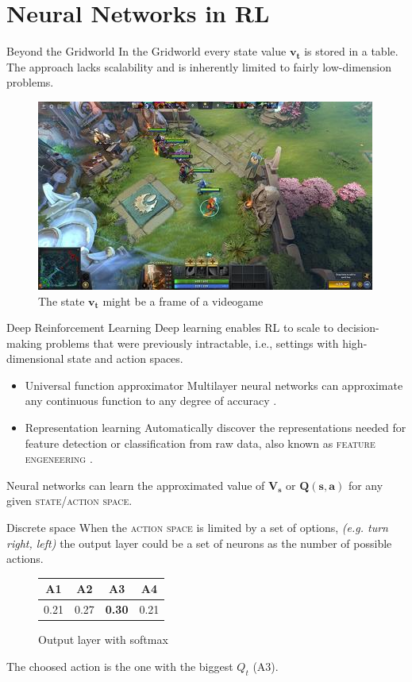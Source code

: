 \documentclass[10pt]{beamer}
\begin{document}
\section{Neural Networks in RL}
\begin{frame}{Beyond the Gridworld}
	In the Gridworld every state value $\mathbf{v_t}$ is stored in a table. 
	The approach lacks scalability and is inherently limited to fairly low-dimension problems.
	\begin{figure}
		\includegraphics[scale=0.4]{img/dota2.jpg}
		\caption{The state $\mathbf{v_t}$ might be a frame of a videogame \cite{dota2}}
	\end{figure}
\end{frame}
\begin{frame}[fragile]{Deep Reinforcement Learning}
Deep  learning  enables  RL  to  scale  to  decision-making
problems  that  were  previously  intractable,  i.e.,  settings  with
high-dimensional  state  and  action  spaces. \cite{arulkumaran2017brief}
	\begin{itemize}
		\item \alert{Universal function approximator} Multilayer neural networks can approximate any continuous function to any degree of accuracy \cite{hornik1989multilayer}.
		\pause
		\item \alert{Representation learning} Automatically discover the representations needed for feature detection or classification from raw data, also known as \textsc{feature engeneering} \cite{bengio2013representation}.
	\end{itemize}
	Neural networks can learn the approximated value of $\mathbf{V_s}$ or $\mathbf{Q(s, a)}$ for any given \textsc{state/action space}.
\end{frame}

\begin{frame}{Discrete space}
	When the \textsc{action space} is limited by a set of options, \textit{(e.g. turn right, left)} the output layer could be a set of neurons as the number of possible actions.
	\begin{figure}
		\begin{tabular}{ |c|c|c|c| } 
		 \hline
			\textbf{A1} & \textbf{A2} & \textbf{A3} & \textbf{A4}  \\ [0.5ex] 
		 \hline
		 \hline
			 0.21 & 0.27 & \textbf{0.30} & 0.21 \\ 
		 \hline
		\end{tabular}
		\caption{Output layer with softmax}
	\end{figure}
	The choosed action is the one with the biggest $Q_t$ (\textsc{A3}).
\end{frame}
\end{document}
